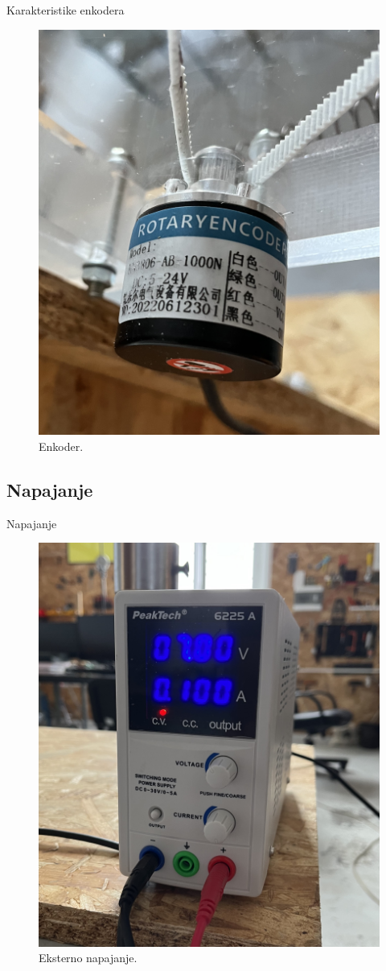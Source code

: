 \documentclass[aspectratio=169,xcolor=dvipsnames]{beamer}
\begin{document}
\begin{frame}{Karakteristike enkodera}
    \begin{figure}
    \includegraphics[width=0.3\linewidth]{master_fig/enc2.jpeg}
    \caption{Enkoder.}
    \end{figure}
\end{frame}


\subsection{Napajanje}

\begin{frame}{Napajanje}
    \begin{figure}
    \includegraphics[width=0.3\linewidth]{master_fig/peaktech2.jpeg}
    \caption{Eksterno napajanje.}
    \end{figure}
\end{frame}

\end{document}
